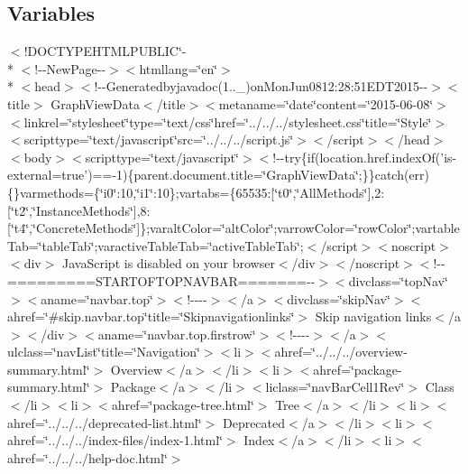\subsection*{Variables}
\begin{DoxyCompactItemize}
\item 
$<$!D\-O\-C\-T\-Y\-P\-E\-H\-T\-M\-L\-P\-U\-B\-L\-I\-C\char`\"{}-\/\\*
$<$!-\/-\/New\-Page-\/-\/$>$$<$htmllang=\char`\"{}en\char`\"{}$>$\\*
$<$head$>$$<$!-\/-\/Generatedbyjavadoc(1..\-\_)on\-Mon\-Jun0812\-:28\-:51\-E\-D\-T2015-\/-\/$>$$<$title$>$ Graph\-View\-Data$<$/title$>$$<$metaname=\char`\"{}date\char`\"{}content=\char`\"{}2015-\/06-\/08\char`\"{}$>$$<$linkrel=\char`\"{}stylesheet\char`\"{}type=\char`\"{}text/css\char`\"{}href=\char`\"{}../../../stylesheet.\-css\char`\"{}title=\char`\"{}\-Style\char`\"{}$>$$<$scripttype=\char`\"{}text/javascript\char`\"{}src=\char`\"{}../../../script.\-js\char`\"{}$>$$<$/script$>$$<$/head$>$$<$body$>$$<$scripttype=\char`\"{}text/javascript\char`\"{}$>$$<$!-\/-\/try\{if(location.\-href.\-index\-Of('is-\/external=true')==-\/1)\{parent.\-document.\-title=\char`\"{}\-Graph\-View\-Data\char`\"{};\}\}catch(err)\{\}varmethods=\{\char`\"{}i0\char`\"{}\-:10,\char`\"{}i1\char`\"{}\-:10\};vartabs=\{65535\-:\mbox{[}\char`\"{}t0\char`\"{},\char`\"{}\-All\-Methods\char`\"{}\mbox{]},2\-:\mbox{[}\char`\"{}t2\char`\"{},\char`\"{}\-Instance\-Methods\char`\"{}\mbox{]},8\-:\mbox{[}\char`\"{}t4\char`\"{},\char`\"{}\-Concrete\-Methods\char`\"{}\mbox{]}\};varalt\-Color=\char`\"{}alt\-Color\char`\"{};varrow\-Color=\char`\"{}row\-Color\char`\"{};vartable\-Tab=\char`\"{}table\-Tab\char`\"{};varactive\-Table\-Tab=\char`\"{}active\-Table\-Tab\char`\"{};$<$/script$>$$<$noscript$>$$<$div$>$ Java\-Script is disabled on your browser$<$/div$>$$<$/noscript$>$$<$!-\/-\/=========\-S\-T\-A\-R\-T\-O\-F\-T\-O\-P\-N\-A\-V\-B\-A\-R=======-\/-\/$>$$<$divclass=\char`\"{}top\-Nav\char`\"{}$>$$<$aname=\char`\"{}navbar.\-top\char`\"{}$>$$<$!-\/-\/-\/-\/$>$$<$/a$>$$<$divclass=\char`\"{}skip\-Nav\char`\"{}$>$$<$ahref=\char`\"{}\#skip.\-navbar.\-top\char`\"{}title=\char`\"{}\-Skipnavigationlinks\char`\"{}$>$ Skip navigation links$<$/a$>$$<$/div$>$$<$aname=\char`\"{}navbar.\-top.\-firstrow\char`\"{}$>$$<$!-\/-\/-\/-\/$>$$<$/a$>$$<$ulclass=\char`\"{}nav\-List\char`\"{}title=\char`\"{}\-Navigation\char`\"{}$>$$<$li$>$$<$ahref=\char`\"{}../../../overview-\/summary.\-html\char`\"{}$>$ Overview$<$/a$>$$<$/li$>$$<$li$>$$<$ahref=\char`\"{}package-\/summary.\-html\char`\"{}$>$ Package$<$/a$>$$<$/li$>$$<$liclass=\char`\"{}nav\-Bar\-Cell1\-Rev\char`\"{}$>$ Class$<$/li$>$$<$li$>$$<$ahref=\char`\"{}package-\/tree.\-html\char`\"{}$>$ Tree$<$/a$>$$<$/li$>$$<$li$>$$<$ahref=\char`\"{}../../../deprecated-\/list.\-html\char`\"{}$>$ Deprecated$<$/a$>$$<$/li$>$$<$li$>$$<$ahref=\char`\"{}../../../index-\/files/index-\/1.\-html\char`\"{}$>$ Index$<$/a$>$$<$/li$>$$<$li$>$$<$ahref=\char`\"{}../../../help-\/doc.\-html\char`\"{}$>$ $$
\end{DoxyCompactItemize}

